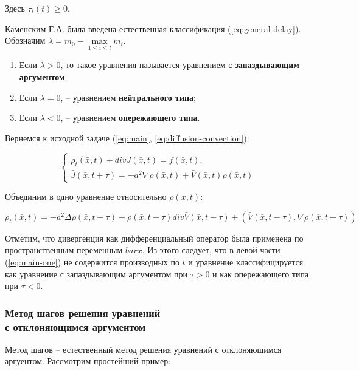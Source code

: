 Здесь $\tau_i(t) \geq 0$.

Каменским Г.А. была введена естественная классификация (\ref{eq:general-delay}). Обозначим $\lambda = m_0 - \max\limits_{1 \leq i \leq l} m_i$.

\begin{enumerate}
\item Если $\lambda > 0$, то такое уравнения называется уравнением с \textbf{запаздывающим аргументом};
\item Если $\lambda = 0$, \--- уравнением \textbf{нейтрального типа};
\item Если $\lambda < 0$, \--- уравнением \textbf{опережающего типа}.
\end{enumerate}

Вернемся к исходной задаче (\ref{eq:main}, \ref{eq:diffusion-convection}):

\begin{equation}
\left\{
\begin{aligned}
\rho_t(\bar{x},t) + div \bar{J}(\bar{x},t) = f(\bar{x},t),\\
\bar{J}(\bar{x},t+\tau) = -a^2 \nabla \rho(\bar{x},t) + \bar{V}(\bar{x},t) \rho(\bar{x},t)
\end{aligned}
\right.
\end{equation}

Объединим в одно уравнение относительно $\rho(x,t)$:

\begin{equation}\label{eq:main-one}
\rho_t(\bar{x},t) = -a^2 \Delta \rho(\bar{x},t-\tau) + \rho(\bar{x},t-\tau) div \bar{V}(\bar{x},t-\tau) + (\bar{V}(\bar{x},t-\tau),\nabla \rho(\bar{x},t-\tau))
\end{equation}

Отметим, что дивергенция как дифференциальный оператор была применена по пространственным переменным $bar{x}$. Из этого следует, что в левой части (\ref{eq:main-one}) не содержится производных по $t$ и уравнение классифицируется как уравнение с запаздывающим аргументом при $\tau>0$ и как опережающего типа при $\tau<0$.

\subsubsection{Метод шагов решения уравнений\\с отклоняющимся аргументом}

Метод шагов \--- естественный метод решения уравнений с отклоняющимся аргуентом. Рассмотрим простейший пример:


